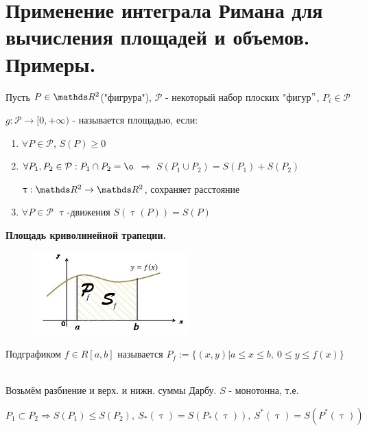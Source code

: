 \documentclass[matan]{subfiles}
\begin{document}
  \newpage
  \section{Применение интеграла Римана для вычисления площадей и объемов. Примеры.}

  \begin{definition} [школьное]
      Пусть $P \in \R^2$("фигрура"), $\mathcal{P}$ - некоторый набор плоских "фигур$"$, $P_i \in \mathcal{P}$

      $g: \mathcal{P} \rightarrow [0, +\infty)$ - называется площадью, если:
      \begin{enumerate}
          \item $\forall P \in \mathcal{P}$, $S(P) \geqslant 0$
          \item $\forall P_1, P_2 \in \mathcal{P}: P_1 \cap P_2 = \o$ $\Rightarrow$ $S(P_1 \cup P_2)=S(P_1)+S(P_2)$
          \begin{definition}
              $\uptau: \R^2 \rightarrow \R^2$, сохраняет расстояние
          \end{definition}
          \item $\forall P \in \mathcal{P}$ $\uptau$-движения $S(\uptau(P))=S(P)$
      \end{enumerate}
  \end{definition}

  \begin{center}
      \textbf{Площадь криволинейной трапеции.}
  \end{center}

  \begin{figure}[H]
      \centering
      \includegraphics[width=6cm]{pics/31_1}
  \end{figure}

  \begin{definition}
      Подграфиком $f \in R[a,b]$ называется $P_f := \{(x,y)| a \leqslant x \leqslant b,\ 0 \leqslant y \leqslant f(x) \}$
  \end{definition}
  \\
  Возьмём разбиение и верх. и нижн. суммы Дарбу. $S$ - монотонна, т.е.

  $$P_1 \subset P_2 \Rightarrow S(P_1) \leqslant S(P_2),\ S_*(\uptau)=S(P_*(\uptau)),\ S^*(\uptau)=S(P^*(\uptau))$$
\end{document}
